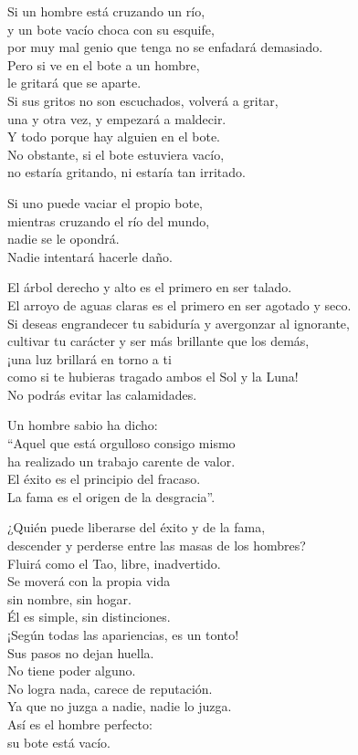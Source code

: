 \documentclass[book,b5paper,hidelinks,final]{memoir}
\begin{document}
	Si un hombre está cruzando un río,\\
	y un bote vacío choca con su esquife,\\
	por muy mal genio que tenga no se enfadará demasiado.\\
	Pero si ve en el bote a un hombre,\\
	le gritará que se aparte.\\
	Si sus gritos no son escuchados, volverá a gritar,\\
	una y otra vez, y empezará a maldecir.\\
	Y todo porque hay alguien en el bote.\\
	No obstante, si el bote estuviera vacío,\\
	no estaría gritando, ni estaría tan irritado.
	
	Si uno puede vaciar el propio bote,\\
	mientras cruzando el río del mundo,\\
	nadie se le opondrá.\\
	Nadie intentará hacerle daño.
	
	El árbol derecho y alto es el primero en ser talado.\\
	El arroyo de aguas claras es el primero en ser agotado y seco.\\
	Si deseas engrandecer tu sabiduría y avergonzar al ignorante,\\
	cultivar tu carácter y ser más brillante que los demás,\\
	¡una luz brillará en torno a ti\\
	como si te hubieras tragado ambos el Sol y la Luna!\\
	No podrás evitar las calamidades.
	
	Un hombre sabio ha dicho:\\
	``Aquel que está orgulloso consigo mismo\\
	ha realizado un trabajo carente de valor.\\
	El éxito es el principio del fracaso.\\
	La fama es el origen de la desgracia''.
	
	¿Quién puede liberarse del éxito y de la fama,\\
	descender y perderse entre las masas de los hombres?\\
	Fluirá como el Tao, libre, inadvertido.\\
	Se moverá con la propia vida\\
	sin nombre, sin hogar.\\
	Él es simple, sin distinciones.\\
	¡Según todas las apariencias, es un tonto!\\
	Sus pasos no dejan huella.\\
	No tiene poder alguno.\\
	No logra nada, carece de reputación.\\
	Ya que no juzga a nadie, nadie lo juzga.\\
	Así es el hombre perfecto:\\
	su bote está vacío.
	
\end{document}

